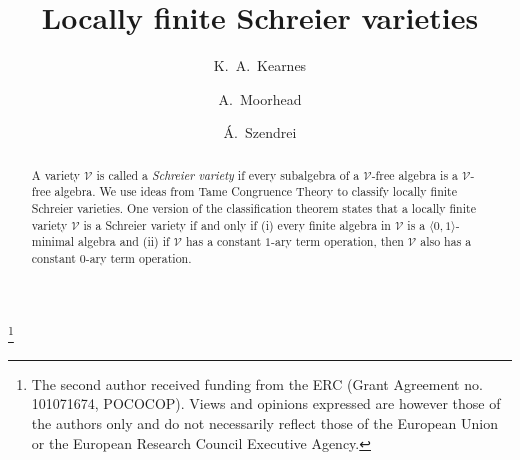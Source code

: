 \documentclass[12pt]{amsart}
\theoremstyle{definition}
\numberwithin{equation}{section}
\begin{document}
\title[Locally finite Schreier varieties]{Locally finite Schreier varieties}

\author{K.~A.~Kearnes}
\address[Keith A. Kearnes]{Department of Mathematics\\
University of Colorado\\
Boulder, CO 80309-0395\\
USA}

\author{A.~Moorhead}
\address[Andrew Moorhead]{Institut f{\" u}r Algebra,
TU Dresden}

\author{\'A.~Szendrei}
\address[\'Agnes Szendrei]{Department of Mathematics\\
University of Colorado\\
Boulder, CO 80309-0395\\
USA}

\thanks{The second author received funding from the ERC
  (Grant Agreement no. 101071674, POCOCOP).
  Views and opinions expressed are however
  those of the authors only and do not necessarily
  reflect those of the European Union or the European Research
Council Executive Agency.}


\begin{abstract}
A variety $\mathcal{V}$ is called a \emph{Schreier variety}
if every subalgebra of a $\mathcal{V}$-free
algebra is a $\mathcal{V}$-free algebra.
We use ideas from Tame Congruence Theory
to classify locally finite Schreier varieties.
One version of the classification theorem states that a locally
finite variety $\mathcal{V}$
is a Schreier variety if and only
if (i) every finite algebra in $\mathcal{V}$
is a $\langle 0,1\rangle$-minimal algebra
and (ii) if $\mathcal{V}$ has a constant
$1$-ary term operation, then $\mathcal{V}$ also has
a constant $0$-ary term operation.
\end{abstract}

\maketitle
\end{document}
